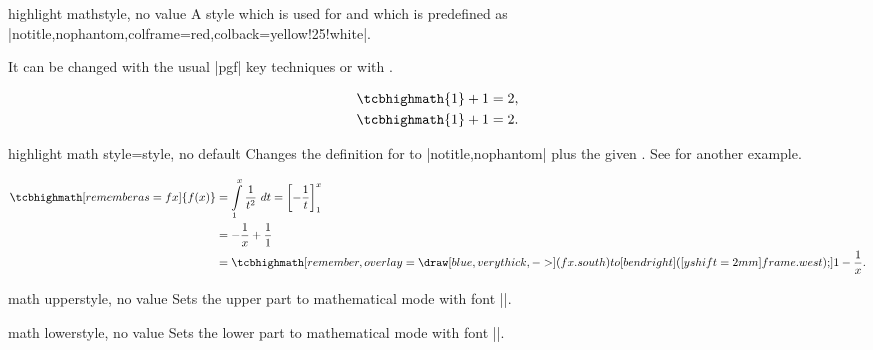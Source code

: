 \clearpage

\begin{docTcbKey}{highlight math}{}{style, no value}
  A style which is used for  and which is
  predefined as |notitle,nophantom,colframe=red,colback=yellow!25!white|.\par
  It can be changed with the usual |pgf| key techniques or
  with .
\begin{dispExample}
\begin{align*}
  \tcbhighmath{1} + 1 &= 2,\\
  \tcbset{highlight math/.append style={left=0mm,right=0mm,top=0mm,bottom=0mm}}
  \tcbhighmath{1} + 1 &= 2.
\end{align*}
\end{dispExample}

\end{docTcbKey}


\begin{docTcbKey}{highlight math style}{=}{style, no default}
  Changes the definition for  to
  |notitle,nophantom| plus the given .
  See  for another example.
\begin{dispExample}
\begin{align*}
\tcbhighmath[remember as=fx]{f(x)}
     &= \int\limits_{1}^{x} \frac{1}{t^2}~dt
      = \left[ -\frac{1}{t} \right]_{1}^{x}\\
     &= -\frac{1}{x} + \frac{1}{1}\\
     &=
\tcbhighmath[remember,overlay={%
    \draw[blue,very thick,->] (fx.south) to[bend right] ([yshift=2mm]frame.west);}]
  {1-\frac{1}{x}.}
\end{align*}
\end{dispExample}
\end{docTcbKey}

\clearpage
\begin{docTcbKey}{math upper}{}{style, no value}
  Sets the upper part to mathematical mode with font |\displaystyle|.
\end{docTcbKey}

\begin{docTcbKey}{math lower}{}{style, no value}
  Sets the lower part to mathematical mode with font |\displaystyle|.
\end{docTcbKey}

